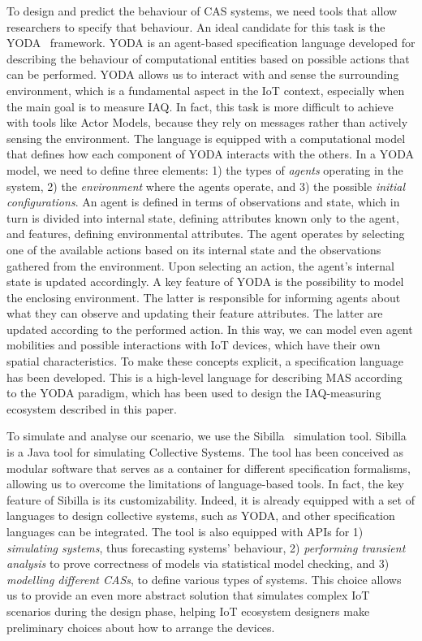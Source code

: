 \documentclass[runningheads]{llncs}
\newcommand{\yoda}{\textsf{YODA}}
\newcommand{\sibilla}{\textsf{Sibilla}}
\begin{document}
To design and predict the behaviour of CAS systems, we need tools that allow researchers to specify that behaviour. An ideal candidate for this task is the \yoda{}~\cite{yoda} framework. 
%
\yoda{} is an agent-based specification language developed for describing the behaviour of computational entities based on possible actions that can be performed.
%
\yoda{} allows us to interact with and sense the surrounding environment, which is a fundamental aspect in the IoT context, especially when the main goal is to measure IAQ. In fact, this task is more difficult to achieve with tools like Actor Models, because they rely on messages rather than actively sensing the environment.
%
The language is equipped with a computational model that defines how each component of \yoda{} interacts with the others.
%
In a \yoda{} model, we need to define three elements: 1) the types of \emph{agents} operating in the system, 2) the \emph{environment} where the agents operate, and 3) the possible \emph{initial configurations}.
%
An agent is defined in terms of observations and state, which in turn is divided into internal state, defining attributes known only to the agent, and features, defining environmental attributes.
%
The agent operates by selecting one of the available actions based on its internal state and the observations gathered from the environment. Upon selecting an action, the agent's internal state is updated accordingly.
%
A key feature of \yoda{} is the possibility to model the enclosing environment.
%
The latter is responsible for informing agents about what they can observe and updating their feature attributes. The latter are updated according to the performed action.
%
In this way, we can model even agent mobilities and possible interactions with IoT devices, which have their own spatial characteristics.
%
To make these concepts explicit, a specification language has been developed. This is a high-level language for describing MAS according to the \yoda{} paradigm, which has been used to design the IAQ-measuring ecosystem described in this paper.



To simulate and analyse our scenario, we use the \sibilla{}~\cite{sibilla} simulation tool. 
%
\sibilla{} is a Java tool for simulating Collective Systems. 
%
The tool has been conceived as modular software that serves as a container for different specification formalisms, allowing us to overcome the limitations of language-based tools.
%
In fact, the key feature of \sibilla{} is its customizability. Indeed, it is already equipped with a set of languages to design collective systems, such as \yoda{}, and other specification languages can be integrated.
%
The tool is also equipped with APIs for 1) \emph{simulating systems}, thus forecasting systems' behaviour, 2) \emph{performing transient analysis} to prove correctness of models via statistical model checking, and 3) \emph{modelling different CASs}, to define various types of systems.
%
This choice allows us to provide an even more abstract solution that simulates complex IoT scenarios during the design phase, helping IoT ecosystem designers make preliminary choices about how to arrange the devices.
\end{document}

